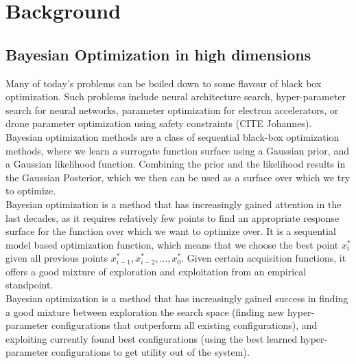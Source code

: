 
\chapter{Background}  %

\ifpdf
    \graphicspath{{Chapter1/Figs/Raster/}{Chapter1/Figs/PDF/}{Chapter1/Figs/}}
\else
    \graphicspath{{Chapter1/Figs/Vector/}{Chapter1/Figs/}}
\fi


\section{Bayesian Optimization in high dimensions} %

Many of today's problems can be boiled down to some flavour of black box optimization. 
Such problems include neural architecture search, hyper-parameter search for neural networks, parameter optimization for electron accelerators, or drone parameter optimization using safety constraints (CITE Johannes). \\

Bayesian optimization methods are a class of sequential black-box optimization methods, where we learn a surrogate function surface using a Gaussian prior, and a Gaussian likelihood function.
Combining the prior and the likelihood results in the Gaussian Posterior, which we then can be used as a surface over which we try to optimize. \\

Bayesian optimization is a method that has increasingly gained attention in the last decades, as it requires relatively few points to find an appropriate response surface for the function over which we want to optimize over.
It is a sequential model based optimization function, which means that we choose the best point $x^*_i$ given all previous points $x^*_{i-1}, x^*_{i-2}, \ldots, x^*_{0}$.
Given certain acquisition functions, it offers a good mixture of exploration and exploitation from an empirical standpoint. \\

Bayesian optimization is a method that has increasingly gained success in finding a good mixture between exploration the search space (finding new hyper-parameter configurations that outperform all existing configurations), and exploiting currently found best configurations (using the best learned hyper-parameter configurations to get utility out of the system). \\

